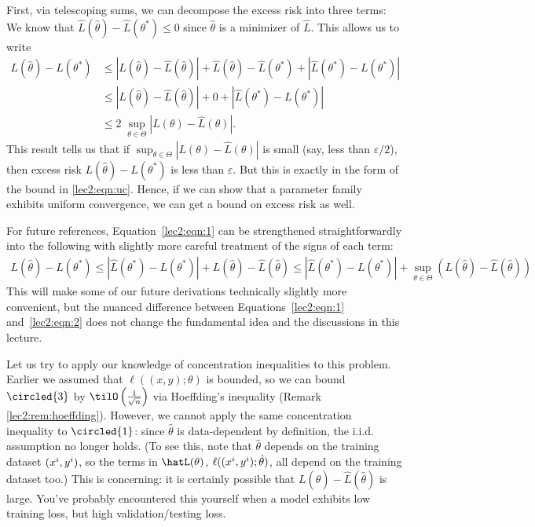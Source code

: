 First, via telescoping sums, we can decompose the excess risk into three terms:
We know that $\hat{L}(\hat{\theta}) - \hat{L}(\theta^*) \leq 0$ since $\hat{\theta}$ is a minimizer of $\hat{L}$. This allows us to write
\begin{align}
L(\hat{\theta}) - L(\theta^*) &\leq |L(\hat{\theta}) - \hat{L}(\hat{\theta})| + \hat{L}(\hat{\theta}) - \hat{L}(\theta^*) + |\hat{L}(\theta^*) - L(\theta^*)|\\
&\leq |L(\hat{\theta}) - \hat{L}(\hat{\theta})| + 0 + |\hat{L}(\theta^*) - L(\theta^*)|\\
&\leq 2\;\sup_{\theta \in \Theta } |L(\theta) - \hat{L}(\theta)|. \label{lec2:eqn:1}
\end{align}
This result tells us that if $\sup_{\theta \in \Theta } |L(\theta) - \hat{L}(\theta)|$ is small (say, less than $\varepsilon/2$), then excess risk $L(\hat{\theta}) - L(\theta^*)$ is less than $\varepsilon$. But this is exactly in the form of the bound in \eqref{lec2:eqn:uc}. Hence, if we can show that a parameter family exhibits uniform convergence, we can get a bound on excess risk as well.

For future references, Equation~\eqref{lec2:eqn:1} can be strengthened straightforwardly into the following with slightly more careful treatment of the signs of each term:
\begin{align}
L(\hat{\theta}) - L(\theta^*) \le |\hat{L}(\theta^*) - L(\theta^*)|+  L(\hat{\theta}) - \hat{L}(\hat{\theta})  \le |\hat{L}(\theta^*) - L(\theta^*)|+ \sup_{\theta \in \Theta} \left(L(\hat{\theta}) - \hat{L}(\hat{\theta})\right)\label{lec2:eqn:2}
\end{align}
This will make some of our future derivations technically slightly more convenient, but the nuanced difference between Equations~\eqref{lec2:eqn:1} and~\eqref{lec2:eqn:2} does not change the fundamental idea and the discussions in this lecture. 

Let us try to apply our knowledge of concentration inequalities to this problem. Earlier we assumed that $\ell((x, y); \theta)$ is bounded, so we can bound $\circled{3}$ by $\tilO\left(\frac{1}{\sqrt{n}}\right)$ via Hoeffding's inequality (Remark \ref{lec2:rem:hoeffding}). However, we cannot apply the same concentration inequality to $\circled{1}$: since $\hat{\theta}$ is data-dependent by definition, the i.i.d. assumption no longer holds. (To see this, note that $\hat\theta$ depends on the training dataset $(x\sp{i}, y\sp{i})$, so the terms in $\hatL (\theta)$, $\ell ((x\sp{i}, y\sp{i}); \hat\theta)$, all depend on the training dataset too.) This is concerning: it is certainly possible that $L(\hat{\theta}) - \hat{L}(\hat{\theta})$ is large. You've probably encountered this yourself when a model exhibits low training loss, but high validation/testing loss. 

